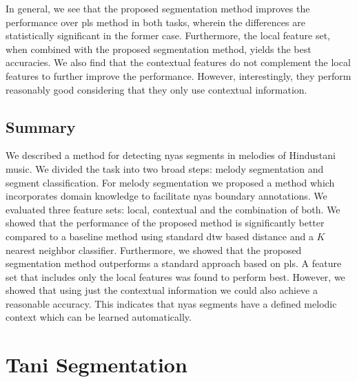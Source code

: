 {In general, we see that the proposed segmentation method improves the performance over \gls{pls} method in both tasks, wherein the differences are statistically significant in the former case. Furthermore, the local feature set, when combined with the proposed segmentation method, yields the best accuracies. We also find that the contextual features do not complement the local features to further improve the performance. However, interestingly, they perform reasonably good considering that they only use contextual information.


\subsection{Summary}
\label{ConclusionAndFutureWork}

We described a method for detecting \gls{nyas} segments in melodies of Hindustani music. We divided the task into two broad steps: melody segmentation and segment classification. For melody segmentation we proposed a method which incorporates domain knowledge to facilitate \gls{nyas} boundary annotations. We evaluated three feature sets: local, contextual and the combination of both. We showed that the performance of the proposed method is significantly better compared to a baseline method using standard \gls{dtw} based distance and a $K$ nearest neighbor classifier. Furthermore, we showed that the proposed segmentation method outperforms a standard approach based on \gls{pls}. A feature set that includes only the local features was found to perform best. However, we showed that using just the contextual information we could also achieve a reasonable accuracy. This indicates that \gls{nyas} segments have a defined melodic context which can be learned automatically. 


\section{Tani Segmentation}
\label{sec:pre_processing_tani_segmentation}

}
